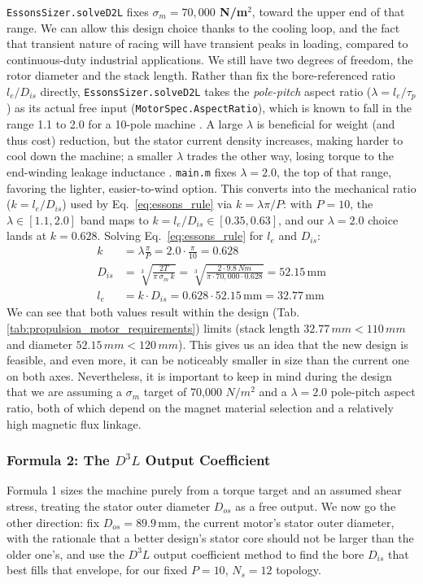 \documentclass[11pt,a4paper]{article}
\begin{document}
\texttt{EssonsSizer.solveD2L} fixes \textbf{$\sigma_m = 70,000$ N/m$^2$}, toward the upper end of that range. We can allow this design choice thanks to the cooling loop, and the fact that transient nature of racing will have transient peaks in loading, compared to continuous-duty industrial applications.
We still have two degrees of freedom, the rotor diameter and the stack length. Rather than fix the bore-referenced ratio $l_e/D_{is}$ directly, \texttt{EssonsSizer.solveD2L} takes the \emph{pole-pitch} aspect ratio ($\lambda = l_e/\tau_p$) as its actual free input (\texttt{MotorSpec.AspectRatio}), which is known to fall in the range 1.1 to 2.0 for a 10-pole machine \cite{Lipo2017}. A large $\lambda$ is beneficial for weight (and thus cost) reduction, but the stator current density increases, making harder to cool down the machine; a smaller $\lambda$ trades the other way, losing torque to the end-winding leakage inductance \cite{LucaLecture6}. \texttt{main.m} fixes $\lambda=2.0$, the top of that range, favoring the lighter, easier-to-wind option. This converts into the mechanical ratio ($k = l_e/D_{is}$) used by Eq.~\ref{eq:essons_rule} via $k = \lambda\pi/P$: with $P=10$, the $\lambda\in[1.1,2.0]$ band maps to $k=l_e/D_{is}\in[0.35,0.63]$, and our $\lambda=2.0$ choice lands at $k=0.628$. Solving Eq.~\ref{eq:essons_rule} for $l_e$ and $D_{is}$:
\begin{align*}
k &= \lambda\frac{\pi}{P} = 2.0\cdot\frac{\pi}{10} = 0.628 \\
D_{is} &= \sqrt[3]{\frac{2T}{\pi\,\sigma_m\, k}} = \sqrt[3]{\frac{2\cdot 9.8\,Nm}{\pi\cdot 70{,}000\cdot 0.628}} = 52.15\,\text{mm} \\
l_e &= k\cdot D_{is} = 0.628\cdot 52.15\,\text{mm} = 32.77\,\text{mm}
\end{align*}
We can see that both values result within the design (Tab.\ref{tab:propulsion_motor_requirements}) limits (stack length $32.77\,mm < 110\,mm$ and diameter $52.15\,mm < 120\,mm$). This gives us an idea that the new design is feasible, and even more, it can be noticeably smaller in size than the current one on both axes. Nevertheless, it is important to keep in mind during the design that we are assuming a $\sigma_m$ target of 70,000 $N/m^2$ and a $\lambda=2.0$ pole-pitch aspect ratio, both of which depend on the magnet material selection and a relatively high magnetic flux linkage.
\subsubsection*{Formula 2: The $D^3L$ Output Coefficient}
Formula 1 sizes the machine purely from a torque target and an assumed shear stress, treating the stator outer diameter $D_{os}$ as a free output. We now go the other direction: fix $D_{os}=89.9\,\text{mm}$, the current motor's stator outer diameter, with the rationale that a better design's stator core should not be larger than the older one's, and use the $D^3L$ output coefficient method \cite{LucaLecture6} to find the bore $D_{is}$ that best fills that envelope, for our fixed $P=10$, $N_s=12$ topology.
\end{document}
